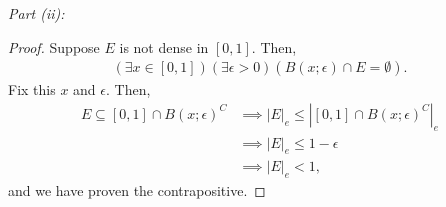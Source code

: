 \documentclass[10pt,a4paper]{article}
\makeatletter
\theoremstyle{theorem}
\newcommand{\proofpart}[2]{%
  \par
  \addvspace{\medskipamount}%
  \noindent\emph{Part #1: #2}\par\nobreak
  \addvspace{\smallskipamount}%
  \@afterheading
}
\theoremstyle{definition}
\makeatother
\begin{document}
\proofpart{(ii)}{}
\begin{proof}
Suppose $E$ is not dense in $[0, 1]$. Then, 
\begin{align*}
(\exists x \in [0, 1])(\exists \epsilon > 0)(B(x; \epsilon) \cap E = \emptyset).
\end{align*}
Fix this $x$ and $\epsilon$. Then,
\begin{align*}
E \subseteq [0, 1] \cap B(x; \epsilon)^C &\implies |E|_e \leq |[0, 1] \cap B(x; \epsilon)^C |_e\\
&\implies |E|_e \leq 1 - \epsilon\\
&\implies |E|_e < 1,
\end{align*}
and we have proven the contrapositive. 
\end{proof}
\end{document}
